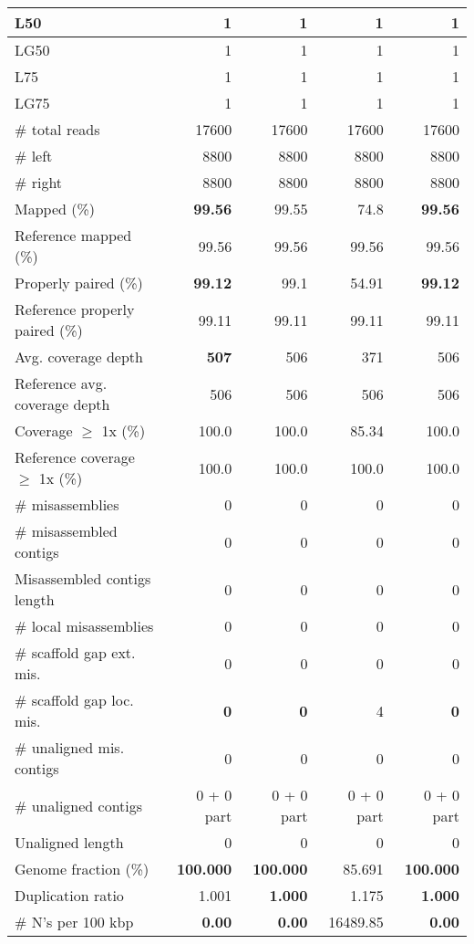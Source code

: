 \documentclass[12pt,a4paper]{article}
\begin{document}
\begin{table}[ht]
\begin{center}
\begin{tabular}{|l*{4}{|r}|}
L50 & 1 & 1 & 1 & 1 \\ \hline
LG50 & 1 & 1 & 1 & 1 \\ \hline
L75 & 1 & 1 & 1 & 1 \\ \hline
LG75 & 1 & 1 & 1 & 1 \\ \hline
\# total reads & 17600 & 17600 & 17600 & 17600 \\ \hline
\# left & 8800 & 8800 & 8800 & 8800 \\ \hline
\# right & 8800 & 8800 & 8800 & 8800 \\ \hline
Mapped (\%) & {\bf 99.56} & 99.55 & 74.8 & {\bf 99.56} \\ \hline
Reference mapped (\%) & 99.56 & 99.56 & 99.56 & 99.56 \\ \hline
Properly paired (\%) & {\bf 99.12} & 99.1 & 54.91 & {\bf 99.12} \\ \hline
Reference properly paired (\%) & 99.11 & 99.11 & 99.11 & 99.11 \\ \hline
Avg. coverage depth & {\bf 507} & 506 & 371 & 506 \\ \hline
Reference avg. coverage depth & 506 & 506 & 506 & 506 \\ \hline
Coverage $\geq$ 1x (\%) & 100.0 & 100.0 & 85.34 & 100.0 \\ \hline
Reference coverage $\geq$ 1x (\%) & 100.0 & 100.0 & 100.0 & 100.0 \\ \hline
\# misassemblies & 0 & 0 & 0 & 0 \\ \hline
\# misassembled contigs & 0 & 0 & 0 & 0 \\ \hline
Misassembled contigs length & 0 & 0 & 0 & 0 \\ \hline
\# local misassemblies & 0 & 0 & 0 & 0 \\ \hline
\# scaffold gap ext. mis. & 0 & 0 & 0 & 0 \\ \hline
\# scaffold gap loc. mis. & {\bf 0} & {\bf 0} & 4 & {\bf 0} \\ \hline
\# unaligned mis. contigs & 0 & 0 & 0 & 0 \\ \hline
\# unaligned contigs & 0 + 0 part & 0 + 0 part & 0 + 0 part & 0 + 0 part \\ \hline
Unaligned length & 0 & 0 & 0 & 0 \\ \hline
Genome fraction (\%) & {\bf 100.000} & {\bf 100.000} & 85.691 & {\bf 100.000} \\ \hline
Duplication ratio & 1.001 & {\bf 1.000} & 1.175 & {\bf 1.000} \\ \hline
\# N's per 100 kbp & {\bf 0.00} & {\bf 0.00} & 16489.85 & {\bf 0.00} \\ \hline

\end{tabular}
\end{center}
\end{table}
\end{document}
